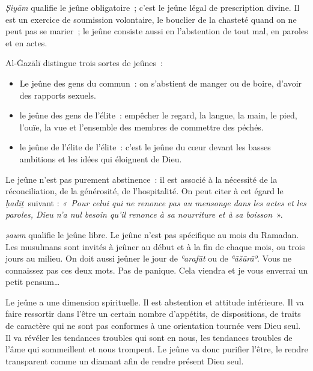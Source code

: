 
\emph{Ṣiyām} qualifie le jeûne obligatoire~; c'est le jeûne légal de
prescription divine. Il est un exercice de soumission volontaire, le
bouclier de la chasteté quand on ne peut pas se marier~; le jeûne
consiste aussi en l'abstention de tout mal, en paroles et en actes.

Al-Ġazālī \label{theol:AlGazali16} distingue trois sortes de jeûnes~:

\begin{itemize}
\item
  Le jeûne des gens du commun~: on s'abstient de manger ou de boire,
  d'avoir des rapports sexuels.
\item
  le jeûne des gens de l'élite~: empêcher le regard, la langue, la main,
  le pied, l'ouïe, la vue et l'ensemble des membres de commettre des
  péchés.
\item
  le jeûne de l'élite de l'élite~: c'est le jeûne du cœur devant les
  basses ambitions et les idées qui éloignent de Dieu.
\end{itemize}

Le jeûne n'est pas purement abstinence~: il est associé à la nécessité
de la réconciliation, de la générosité, de l'hospitalité. On peut citer
à cet égard le \emph{ḥadīṯ}~suivant : \emph{«~Pour celui qui ne renonce
pas au mensonge dans les actes et les paroles, Dieu n'a nul besoin qu'il
renonce à sa nourriture et à sa boisson}~».

\emph{ṣawm} qualifie le jeûne libre. Le jeûne n'est pas spécifique au
mois du Ramadan. Les musulmans sont invités à jeûner au début et à la
fin de chaque mois, ou trois jours au milieu. On doit aussi jeûner le
jour de \emph{ʿarafāt} ou de \emph{ʿāšūrāʾ}. Vous ne connaissez pas ces
deux mots. Pas de panique. Cela viendra et je vous enverrai un petit
pensum\ldots{}

Le jeûne a une dimension spirituelle. Il est abstention et attitude
intérieure. Il va faire ressortir dans l'être un certain nombre
d'appétits, de dispositions, de traits de caractère qui ne sont pas
conformes à une orientation tournée vers Dieu seul. Il va révéler les
tendances troubles qui sont en nous, les tendances troubles de l'âme qui
sommeillent et nous trompent. Le jeûne va donc purifier l'être, le
rendre transparent comme un diamant afin de rendre présent Dieu seul.

